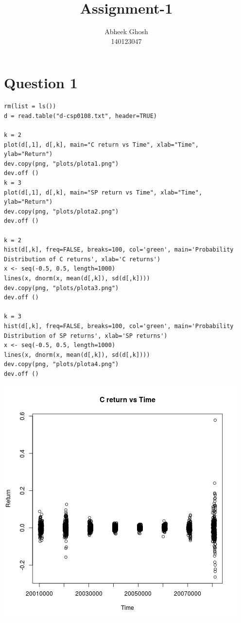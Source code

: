 \documentclass{article}
\begin{document}
	\title{\textbf{Assignment-1}}
	\author{Abheek Ghosh \\ 
		140123047 }
	
	\maketitle
	

\section{Question 1}


\begin{lstlisting}
rm(list = ls())
d = read.table("d-csp0108.txt", header=TRUE)

k = 2
plot(d[,1], d[,k], main="C return vs Time", xlab="Time", ylab="Return")
dev.copy(png, "plots/plota1.png")
dev.off ()
k = 3
plot(d[,1], d[,k], main="SP return vs Time", xlab="Time", ylab="Return")
dev.copy(png, "plots/plota2.png")
dev.off ()

k = 2
hist(d[,k], freq=FALSE, breaks=100, col='green', main='Probability Distribution of C returns', xlab='C returns')
x <- seq(-0.5, 0.5, length=1000)
lines(x, dnorm(x, mean(d[,k]), sd(d[,k])))
dev.copy(png, "plots/plota3.png")
dev.off ()

k = 3
hist(d[,k], freq=FALSE, breaks=100, col='green', main='Probability Distribution of SP returns', xlab='SP returns')
x <- seq(-0.5, 0.5, length=1000)
lines(x, dnorm(x, mean(d[,k]), sd(d[,k])))
dev.copy(png, "plots/plota4.png")
dev.off ()
\end{lstlisting}

\includegraphics{"plota1"}
\pagebreak
\end{document}

